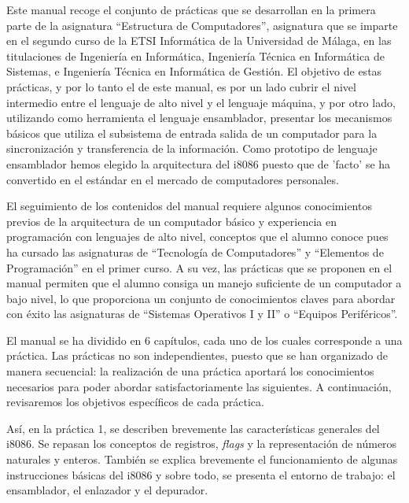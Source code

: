 
\minitoc

Este manual recoge el conjunto de prácticas que se desarrollan en la
primera parte de la asignatura  ``Estructura de Computadores'',
asignatura que se imparte en el segundo curso de la ETSI Informática
de la Universidad de Málaga, en las titulaciones de Ingeniería en Informática,
Ingeniería Técnica en Informática de Sistemas, e Ingeniería Técnica en
Informática de Gestión. El objetivo de estas prácticas, y por lo tanto
el de este manual, es por un lado cubrir el nivel intermedio entre el
 lenguaje de alto nivel y el lenguaje máquina, y por otro lado,
utilizando como herramienta el lenguaje ensamblador, presentar los
mecanismos básicos que utiliza el subsistema de entrada salida de un
computador para la sincronización y transferencia de la
información. Como prototipo de lenguaje ensamblador hemos elegido la
arquitectura del i8086 puesto que de 'facto' se ha convertido en el
estándar en el  mercado de computadores personales.


El seguimiento de los contenidos del manual requiere algunos
conocimientos previos de la arquitectura de un computador básico y 
experiencia en programación con lenguajes de alto nivel, conceptos que
el alumno conoce pues ha cursado las asignaturas de  ``Tecnología de
Computadores'' y ``Elementos de Programación'' en el primer curso. A su vez,
las prácticas que se proponen en el manual permiten que el alumno
consiga un manejo suficiente de un computador a bajo nivel, lo que
proporciona un conjunto de
conocimientos claves para abordar con éxito las asignaturas de
``Sistemas Operativos I y II'' o ``Equipos Periféricos''.

 
El manual se ha dividido en 6 capítulos, cada uno de los cuales
corresponde a una práctica. Las prácticas no son independientes,
puesto que se han organizado de manera secuencial: la realización de
una práctica aportará los conocimientos necesarios para poder abordar
satisfactoriamente las siguientes. A continuación, revisaremos los
objetivos específicos de cada práctica.

Así, en la práctica 1, se describen brevemente las características
generales del i8086. Se repasan los conceptos de registros, {\it flags} y la
representación de números naturales y enteros. También se explica
brevemente el funcionamiento de algunas instrucciones básicas del
i8086 y sobre todo, se presenta  el entorno de trabajo: el
ensamblador, el enlazador y el depurador. 


